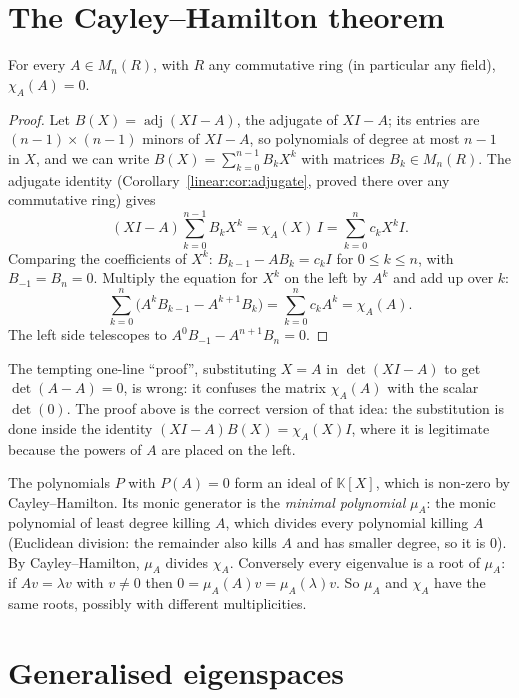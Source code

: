 \section{The Cayley--Hamilton theorem}

\begin{theorem}\label{linear:thm:cayleyhamilton}
For every $A\in M_n(R)$, with $R$ any commutative ring (in particular any field), $\chi_A(A)=0$.
\end{theorem}
\begin{proof}
Let $B(X)=\operatorname{adj}(XI-A)$, the adjugate of $XI-A$; its entries are $(n-1)\times(n-1)$ minors of $XI-A$, so
polynomials of degree at most $n-1$ in $X$, and we can write $B(X)=\sum_{k=0}^{n-1}B_kX^k$ with matrices $B_k\in
M_n(R)$. The adjugate identity (Corollary~\ref{linear:cor:adjugate}, proved there over any commutative ring) gives
\[
(XI-A)\sum_{k=0}^{n-1}B_kX^k=\chi_A(X)\,I=\sum_{k=0}^nc_kX^kI.
\]
Comparing the coefficients of $X^k$: $B_{k-1}-AB_k=c_kI$ for $0\le k\le n$, with $B_{-1}=B_n=0$. Multiply the equation
for $X^k$ on the left by $A^k$ and add up over $k$:
\[
\sum_{k=0}^n\bigl(A^kB_{k-1}-A^{k+1}B_k\bigr)=\sum_{k=0}^nc_kA^k=\chi_A(A).
\]
The left side telescopes to $A^0B_{-1}-A^{n+1}B_n=0$.
\end{proof}

The tempting one-line ``proof'', substituting $X=A$ in $\det(XI-A)$ to get $\det(A-A)=0$, is wrong: it confuses the
matrix $\chi_A(A)$ with the scalar $\det(0)$. The proof above is the correct version of that idea: the substitution is done
inside the identity $(XI-A)B(X)=\chi_A(X)I$, where it is legitimate because the powers of $A$ are placed on the left.

The polynomials $P$ with $P(A)=0$ form an ideal of $\mathbb K[X]$, which is non-zero by Cayley--Hamilton. Its monic
generator is the \emph{minimal polynomial} $\mu_A$: the monic polynomial of least degree killing $A$, which divides every
polynomial killing $A$ (Euclidean division: the remainder also kills $A$ and has smaller degree, so it is $0$). By
Cayley--Hamilton, $\mu_A$ divides $\chi_A$. Conversely every eigenvalue is a root of $\mu_A$: if $Av=\lambda v$ with $v\ne0$ then
$0=\mu_A(A)v=\mu_A(\lambda)v$. So $\mu_A$ and $\chi_A$ have the same roots, possibly with different multiplicities.

\section{Generalised eigenspaces}

